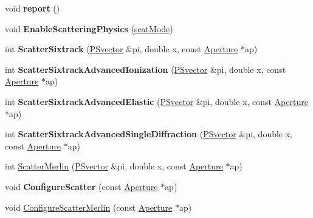 \begin{DoxyCompactItemize}
void {\bfseries report} ()
\item 
\mbox{\label{classParticleTracking_1_1ProtonBunch_a5743cad91de88bc9cbf8d1d767f9dba6}} 
void {\bfseries Enable\+Scattering\+Physics} (\hyperlink{classParticleTracking_1_1ProtonBunch_acf0cdd892624c9fd814e6510e2aecf33}{scat\+Mode})
\item 
\mbox{\label{classParticleTracking_1_1ProtonBunch_a842cb346e91b0717559c8518d44bd469}} 
int {\bfseries Scatter\+Sixtrack} (\hyperlink{classPSvector}{P\+Svector} \&pi, double x, const \hyperlink{classAperture}{Aperture} $\ast$ap)
\item 
\mbox{\label{classParticleTracking_1_1ProtonBunch_ac7ec57f7d9cb3acf9c48067460a7109f}} 
int {\bfseries Scatter\+Sixtrack\+Advanced\+Ionization} (\hyperlink{classPSvector}{P\+Svector} \&pi, double x, const \hyperlink{classAperture}{Aperture} $\ast$ap)
\item 
\mbox{\label{classParticleTracking_1_1ProtonBunch_aae9e1d4f308d3266b734e15ad5057574}} 
int {\bfseries Scatter\+Sixtrack\+Advanced\+Elastic} (\hyperlink{classPSvector}{P\+Svector} \&pi, double x, const \hyperlink{classAperture}{Aperture} $\ast$ap)
\item 
\mbox{\label{classParticleTracking_1_1ProtonBunch_a1735f4df4e284e990af6715b7a001776}} 
int {\bfseries Scatter\+Sixtrack\+Advanced\+Single\+Diffraction} (\hyperlink{classPSvector}{P\+Svector} \&pi, double x, const \hyperlink{classAperture}{Aperture} $\ast$ap)
\item 
int \hyperlink{classParticleTracking_1_1ProtonBunch_acbd045304a1e4fe64388761773a5b074}{Scatter\+Merlin} (\hyperlink{classPSvector}{P\+Svector} \&pi, double x, const \hyperlink{classAperture}{Aperture} $\ast$ap)
\item 
\mbox{\label{classParticleTracking_1_1ProtonBunch_a1394c464048e05c1a124777187c74e0f}} 
void {\bfseries Configure\+Scatter} (const \hyperlink{classAperture}{Aperture} $\ast$ap)
\item 
void \hyperlink{classParticleTracking_1_1ProtonBunch_a1a078ed15d187c5208e6d50ec5a763ed}{Configure\+Scatter\+Merlin} (const \hyperlink{classAperture}{Aperture} $\ast$ap)

\end{DoxyCompactItemize}
